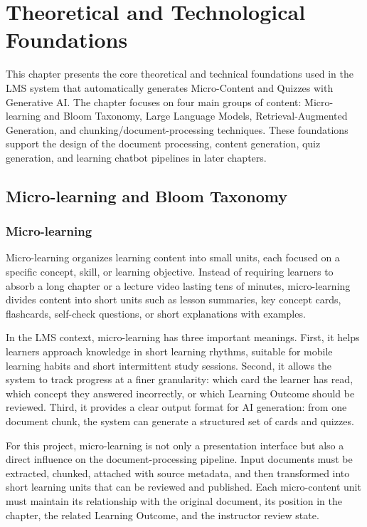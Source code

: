 \chapter{Theoretical and Technological Foundations}
\label{chap:co-so-ly-thuyet-cong-nghe}

This chapter presents the core theoretical and technical foundations used
in the LMS system that automatically generates Micro-Content and Quizzes
with Generative AI. The chapter focuses on four main groups of content:
Micro-learning and Bloom Taxonomy, Large Language Models,
Retrieval-Augmented Generation, and chunking/document-processing
techniques. These foundations support the design of the document
processing, content generation, quiz generation, and learning chatbot
pipelines in later chapters.

\section{Micro-learning and Bloom Taxonomy}
\label{sec:microlearning-bloom}

\subsection{Micro-learning}
\label{subsec:microlearning}

Micro-learning organizes learning content into small units, each focused
on a specific concept, skill, or learning objective. Instead of requiring
learners to absorb a long chapter or a lecture video lasting tens of
minutes, micro-learning divides content into short units such as lesson
summaries, key concept cards, flashcards, self-check questions, or short
explanations with examples.

In the LMS context, micro-learning has three important meanings. First,
it helps learners approach knowledge in short learning rhythms, suitable
for mobile learning habits and short intermittent study sessions. Second,
it allows the system to track progress at a finer granularity: which card
the learner has read, which concept they answered incorrectly, or which
Learning Outcome should be reviewed. Third, it provides a clear output
format for AI generation: from one document chunk, the system can
generate a structured set of cards and quizzes.

For this project, micro-learning is not only a presentation interface but
also a direct influence on the document-processing pipeline. Input
documents must be extracted, chunked, attached with source metadata, and
then transformed into short learning units that can be reviewed and
published. Each micro-content unit must maintain its relationship with
the original document, its position in the chapter, the related Learning
Outcome, and the instructor review state.

